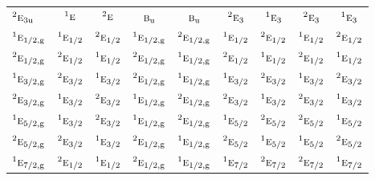 \documentclass[10pt,a4paper]{article}
\numberwithin{equation}{section}
\newcommand{\irr}[1]{\text{\normalfont\scshape #1}}
\newcommand{\conjpair}[1]{{}^{#1}}
\newcommand{\ptag}[1]{\mathrm{#1}}
\begin{document}
{\begin{longtable}{@{}lcccccccc@{}}
$\conjpair{2}\irr{e}_{3\ptag{u}}$ & $\conjpair{1}\irr{e}$ & $\conjpair{2}\irr{e}$ & $\irr{b}_{\ptag{u}}$ & $\irr{b}_{\ptag{u}}$ & $\conjpair{2}\irr{e}_{3}$ & $\conjpair{1}\irr{e}_{3}$ & $\conjpair{2}\irr{e}_{3}$ & $\conjpair{1}\irr{e}_{3}$\\
$\conjpair{1}\irr{e}_{1/2,\ptag{g}}$ & $\conjpair{1}\irr{e}_{1/2}$ & $\conjpair{2}\irr{e}_{1/2}$ & $\conjpair{1}\irr{e}_{1/2,\ptag{g}}$ & $\conjpair{2}\irr{e}_{1/2,\ptag{g}}$ & $\conjpair{1}\irr{e}_{1/2}$ & $\conjpair{2}\irr{e}_{1/2}$ & $\conjpair{1}\irr{e}_{1/2}$ & $\conjpair{2}\irr{e}_{1/2}$\\
$\conjpair{2}\irr{e}_{1/2,\ptag{g}}$ & $\conjpair{2}\irr{e}_{1/2}$ & $\conjpair{1}\irr{e}_{1/2}$ & $\conjpair{2}\irr{e}_{1/2,\ptag{g}}$ & $\conjpair{1}\irr{e}_{1/2,\ptag{g}}$ & $\conjpair{2}\irr{e}_{1/2}$ & $\conjpair{1}\irr{e}_{1/2}$ & $\conjpair{2}\irr{e}_{1/2}$ & $\conjpair{1}\irr{e}_{1/2}$\\
$\conjpair{1}\irr{e}_{3/2,\ptag{g}}$ & $\conjpair{2}\irr{e}_{3/2}$ & $\conjpair{1}\irr{e}_{3/2}$ & $\conjpair{2}\irr{e}_{1/2,\ptag{g}}$ & $\conjpair{1}\irr{e}_{1/2,\ptag{g}}$ & $\conjpair{1}\irr{e}_{3/2}$ & $\conjpair{2}\irr{e}_{3/2}$ & $\conjpair{1}\irr{e}_{3/2}$ & $\conjpair{2}\irr{e}_{3/2}$\\
$\conjpair{2}\irr{e}_{3/2,\ptag{g}}$ & $\conjpair{1}\irr{e}_{3/2}$ & $\conjpair{2}\irr{e}_{3/2}$ & $\conjpair{1}\irr{e}_{1/2,\ptag{g}}$ & $\conjpair{2}\irr{e}_{1/2,\ptag{g}}$ & $\conjpair{2}\irr{e}_{3/2}$ & $\conjpair{1}\irr{e}_{3/2}$ & $\conjpair{2}\irr{e}_{3/2}$ & $\conjpair{1}\irr{e}_{3/2}$\\
$\conjpair{1}\irr{e}_{5/2,\ptag{g}}$ & $\conjpair{1}\irr{e}_{3/2}$ & $\conjpair{2}\irr{e}_{3/2}$ & $\conjpair{1}\irr{e}_{1/2,\ptag{g}}$ & $\conjpair{2}\irr{e}_{1/2,\ptag{g}}$ & $\conjpair{1}\irr{e}_{5/2}$ & $\conjpair{2}\irr{e}_{5/2}$ & $\conjpair{2}\irr{e}_{5/2}$ & $\conjpair{1}\irr{e}_{5/2}$\\
$\conjpair{2}\irr{e}_{5/2,\ptag{g}}$ & $\conjpair{2}\irr{e}_{3/2}$ & $\conjpair{1}\irr{e}_{3/2}$ & $\conjpair{2}\irr{e}_{1/2,\ptag{g}}$ & $\conjpair{1}\irr{e}_{1/2,\ptag{g}}$ & $\conjpair{2}\irr{e}_{5/2}$ & $\conjpair{1}\irr{e}_{5/2}$ & $\conjpair{1}\irr{e}_{5/2}$ & $\conjpair{2}\irr{e}_{5/2}$\\
$\conjpair{1}\irr{e}_{7/2,\ptag{g}}$ & $\conjpair{2}\irr{e}_{1/2}$ & $\conjpair{1}\irr{e}_{1/2}$ & $\conjpair{2}\irr{e}_{1/2,\ptag{g}}$ & $\conjpair{1}\irr{e}_{1/2,\ptag{g}}$ & $\conjpair{1}\irr{e}_{7/2}$ & $\conjpair{2}\irr{e}_{7/2}$ & $\conjpair{2}\irr{e}_{7/2}$ & $\conjpair{1}\irr{e}_{7/2}$\\

\end{longtable}}
\end{document}
